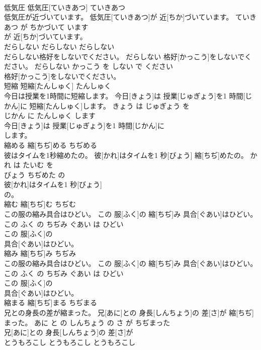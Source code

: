 \documentclass[8pt]{extreport}
\begin{document}
\begin{CJK}{UTF8}{min}
\\	低気圧	低気圧[ていきあつ]	ていきあつ	
\\	低気圧が近づいています。	低気圧[ていきあつ]が 近[ちか]づいています。	ていきあつ が ちかづいて います	
\\	が 近[ちか]づいています。			
\\	だらしない	だらしない	だらしない	
\\	だらしない格好をしないでください。	だらしない 格好[かっこう]をしないでください。	だらしない かっこう を しない で ください	
\\	格好[かっこう]をしないでください。			
\\	短縮	短縮[たんしゅく]	たんしゅく	
\\	今日は授業を1時間に短縮します。	今日[きょう]は 授業[じゅぎょう]を1 時間[じかん]に 短縮[たんしゅく]します。	きょう は じゅぎょう を 
\\	じかん に たんしゅく します	
\\	今日[きょう]は 授業[じゅぎょう]を1 時間[じかん]に
\\	します。			
\\	縮める	縮[ちぢ]める	ちぢめる	
\\	彼はタイムを1秒縮めたの。	彼[かれ]はタイムを1 秒[びょう] 縮[ちぢ]めたの。	かれ は たいむ を 
\\	びょう ちぢめた の	
\\	彼[かれ]はタイムを1 秒[びょう]
\\	の。			
\\	縮む	縮[ちぢ]む	ちぢむ	
\\	この服の縮み具合はひどい。	この 服[ふく]の 縮[ちぢ]み 具合[ぐあい]はひどい。	この ふく の ちぢみ ぐあい は ひどい	
\\	この 服[ふく]の
\\	具合[ぐあい]はひどい。			
\\	縮み	縮[ちぢ]み	ちぢみ	
\\	この服の縮み具合はひどい。	この 服[ふく]の 縮[ちぢ]み 具合[ぐあい]はひどい。	この ふく の ちぢみ ぐあい は ひどい	
\\	この 服[ふく]の
\\	具合[ぐあい]はひどい。			
\\	縮まる	縮[ちぢ]まる	ちぢまる	
\\	兄との身長の差が縮まった。	兄[あに]との 身長[しんちょう]の 差[さ]が 縮[ちぢ]まった。	あに と の しんちょう の さ が ちぢまった	
\\	兄[あに]との 身長[しんちょう]の 差[さ]が
\\	とうもろこし	とうもろこし	とうもろこし	

\end{CJK}
\end{document}
